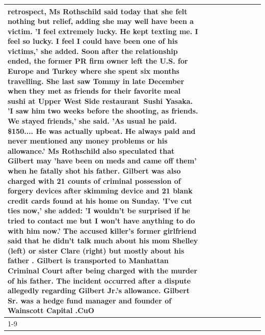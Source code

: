 \begin{table}[H]
\begin{tabular}{lllrlllll}
retrospect, Ms Rothschild said today that she felt nothing but relief, adding she may well have been a victim. 'I feel extremely lucky. He kept texting me. I feel so lucky. I feel I could have been one of his victims,' she added. Soon after the relationship ended, the former PR firm owner left the U.S. for Europe and Turkey where she spent six months  travelling. She last saw Tommy in late December when they met as friends for their favorite meal sushi at Upper West Side restaurant Sushi Yasaka. 'I saw him two weeks before the shooting, as friends. We stayed friends,' she said. 'As usual he paid. \$150.... He was actually upbeat. He always paid and never mentioned any money problems or his allowance.' Ms Rothschild also speculated that Gilbert may 'have been on meds and came off them' when he fatally shot his father. Gilbert was also charged with 21 counts of criminal possession of forgery devices after skimming device and 21 blank credit cards found at his home on Sunday. 'I've cut ties now,' she added: 'I wouldn’t be surprised if he tried to contact me but I won’t have anything to do with him now.' The accused killer's former girlfriend said that he didn't talk much about his mom Shelley (left) or sister Clare (right) but mostly about his father . Gilbert is transported to Manhattan Criminal Court  after being charged with the murder of his father. The incident occurred after a dispute allegedly regarding Gilbert Jr.'s allowance. Gilbert Sr. was a hedge fund manager and founder of Wainscott Capital .CuO \\
\cline{1-9}

\end{tabular}
\end{table}
